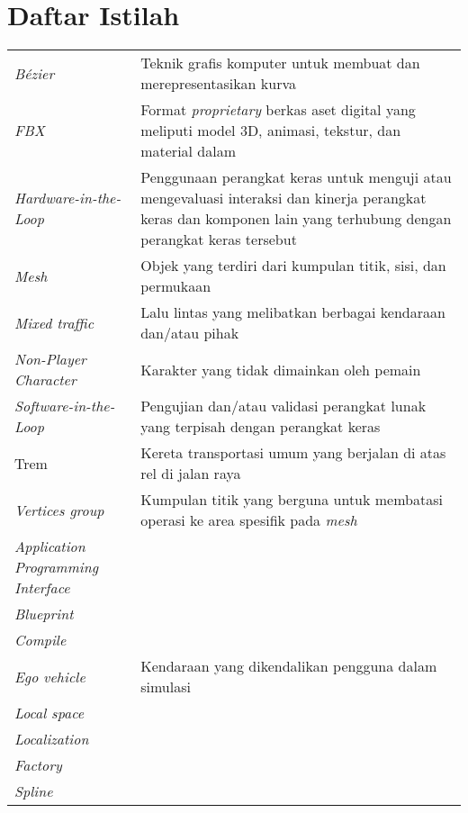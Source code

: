 \chapter*{Daftar Istilah}

\begingroup
\def\arraystretch{1.25}
\begin{table}[h!]
\begin{onehalfspace}
\begin{tabular}{p{} p{}}
	\textit{Bézier} & Teknik grafis komputer untuk membuat dan merepresentasikan kurva \\
	\textit{FBX} & Format \textit{proprietary} berkas aset digital yang meliputi model 3D, animasi, tekstur, dan material dalam \\
	\textit{Hardware-in-the-Loop} & Penggunaan perangkat keras untuk menguji atau mengevaluasi interaksi dan kinerja perangkat keras dan komponen lain yang terhubung dengan perangkat keras tersebut \\
	\textit{Mesh} & Objek yang terdiri dari kumpulan titik, sisi, dan permukaan \\
	\textit{Mixed traffic} & Lalu lintas yang melibatkan berbagai kendaraan dan/atau pihak \\
	\textit{Non-Player Character} & Karakter yang tidak dimainkan oleh pemain \\
	\textit{Software-in-the-Loop} & Pengujian dan/atau validasi perangkat lunak yang terpisah dengan perangkat keras \\
	Trem & Kereta transportasi umum yang berjalan di atas rel di jalan raya \\
	\textit{Vertices group} & Kumpulan titik yang berguna untuk membatasi operasi ke area spesifik pada \textit{mesh} \\

	\textit{Application Programming Interface} & \\
	\textit{Blueprint} &  \\
	\textit{Compile} & \\
	\textit{Ego vehicle} & Kendaraan yang dikendalikan pengguna dalam simulasi \\
	\textit{Local space} & \\
	\textit{Localization} & \\
	\textit{Factory} &  \\
	\textit{Spline} &  \\



\end{tabular}
\end{onehalfspace}
\end{table}
